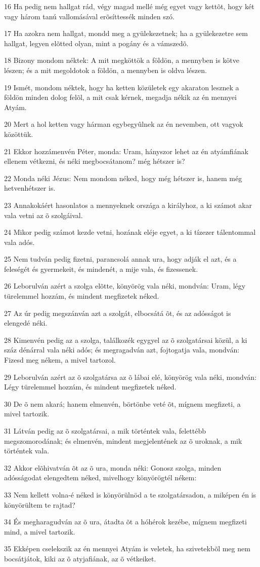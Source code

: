 \par 16 Ha pedig nem hallgat rád, végy magad mellé még egyet vagy kettõt, hogy két vagy három tanú vallomásával erõsíttessék minden szó.
\par 17 Ha azokra nem hallgat, mondd meg a gyülekezetnek; ha a gyülekezetre sem hallgat, legyen elõtted olyan, mint a pogány és a vámszedõ.
\par 18 Bizony mondom néktek: A mit megköttök a földön, a mennyben is kötve lészen; és a mit megoldotok a földön, a mennyben is oldva lészen.
\par 19 Ismét, mondom néktek, hogy ha ketten közületek egy akaraton lesznek a földön minden dolog felõl, a mit csak kérnek, megadja nékik az én mennyei Atyám.
\par 20 Mert a hol ketten vagy hárman egybegyûlnek az én nevemben, ott vagyok közöttük.
\par 21 Ekkor hozzámenvén Péter, monda: Uram, hányszor lehet az én atyámfiának ellenem vétkezni, és néki megbocsátanom? még hétszer is?
\par 22 Monda néki Jézus: Nem mondom néked, hogy még hétszer is, hanem még hetvenhétszer is.
\par 23 Annakokáért hasonlatos a mennyeknek országa a királyhoz, a ki számot akar vala vetni az õ szolgáival.
\par 24 Mikor pedig számot kezde vetni, hozának eléje egyet, a ki tízezer tálentommal vala adós.
\par 25 Nem tudván pedig fizetni, parancsolá annak ura, hogy adják el azt, és a feleségét és gyermekeit, és mindenét, a mije vala, és fizessenek.
\par 26 Leborulván azért a szolga elõtte, könyörög vala néki, mondván: Uram, légy türelemmel hozzám, és mindent megfizetek néked.
\par 27 Az úr pedig megszánván azt a szolgát, elbocsátá õt, és az adósságot is elengedé néki.
\par 28 Kimenvén pedig az a szolga, találkozék egygyel az õ szolgatársai közül, a ki száz dénárral vala néki adós; és megragadván azt, fojtogatja vala, mondván: Fizesd meg nékem, a mivel tartozol.
\par 29 Leborulván azért az õ szolgatársa az õ lábai elé, könyörög vala néki, mondván: Légy türelemmel hozzám, és mindent megfizetek néked.
\par 30 De õ nem akará; hanem elmenvén, börtönbe veté õt, mígnem megfizeti, a mivel tartozik.
\par 31 Látván pedig az õ szolgatársai, a mik történtek vala, felettébb megszomorodának; és elmenvén, mindent megjelentének az õ uroknak, a mik történtek vala.
\par 32 Akkor elõhivatván õt az õ ura, monda néki: Gonosz szolga, minden adósságodat elengedtem néked, mivelhogy könyörögtél nékem:
\par 33 Nem kellett volna-é néked is könyörülnöd a te szolgatársadon, a miképen én is könyörültem te rajtad?
\par 34 És megharagudván az õ ura, átadta õt a hóhérok kezébe, mígnem megfizeti mind, a mivel tartozik.
\par 35 Ekképen cselekszik az én mennyei Atyám is veletek, ha szivetekbõl meg nem bocsátjátok, kiki az õ atyjafiának, az õ vétkeiket.

